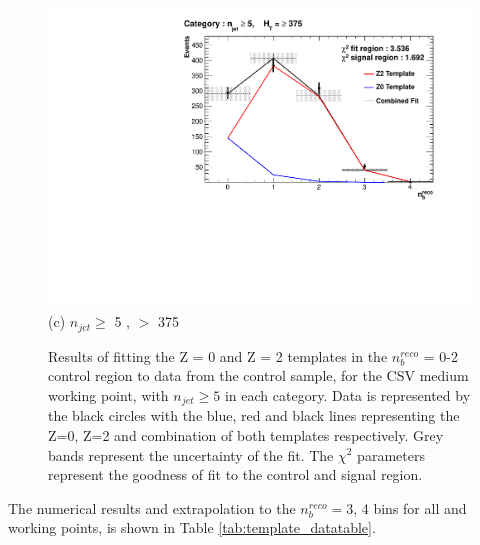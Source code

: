 \begin{figure}[ht]
\begin{minipage}[b]{0.51\linewidth}
\centering
\includegraphics[width = 1.0\linewidth]{plots/ThesisPlots/Final_Fit_To_Data_Normal_Medium_HTBin_OneMuon_Template_375_jet_mult_5.pdf}
\centering (c) $n_{jet} \geq$ 5 , \theht $>$ 375 
\end{minipage}
\caption[Results of fitting the Z = 0 and Z = 2 templates in the $n_{b}^{reco}$ = 0-2 control region to data from the \mupjets control sample, for the \ac{CSV} medium working point, with $n_{jet} \geq 5$ in each \theht category.]{Results of fitting the Z = 0 and Z = 2 templates in the $n_{b}^{reco}$ = 0-2 control region to data from the \mupjets control sample, for the \ac{CSV} medium working point, with $n_{jet} \geq 5$ in each \theht category. Data is represented by the black circles with the blue, red and black lines representing the Z=0, Z=2 and combination of both templates respectively. Grey bands represent the uncertainty of the fit. The $\chi^{2}$ parameters represent the goodness of fit to the control and signal region.}
\label{fig:template_data_med_njet5}
\end{figure}
\FloatBarrier
The numerical results and extrapolation to the $n_{b}^{reco} =$3, 4 bins for all \theht and working points, is shown in Table \ref{tab:template_datatable}.

